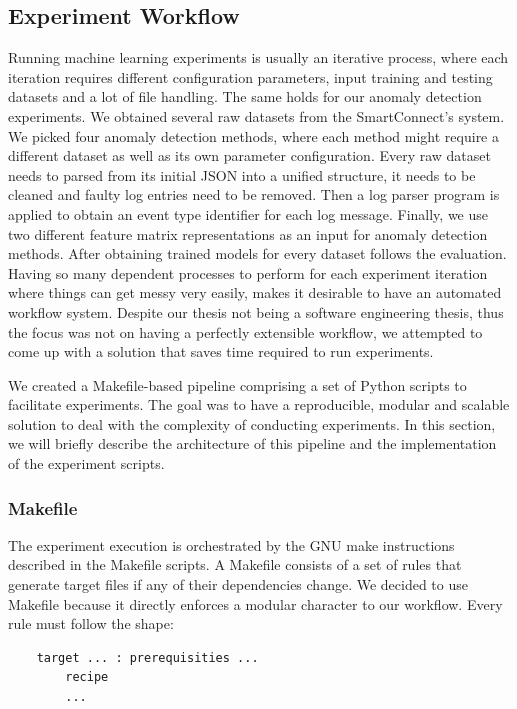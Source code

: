 \subsection{Experiment Workflow}
Running machine learning experiments is usually an iterative process, where each iteration requires different configuration parameters, input training and testing datasets and a lot of file handling. The same holds for our anomaly detection experiments. We obtained several raw datasets from the SmartConnect's system. We picked four anomaly detection methods, where each method might require a different dataset as well as its own parameter configuration. Every raw dataset needs to parsed from its initial JSON into a unified structure, it needs to be cleaned and faulty log entries need to be removed. Then a log parser program is applied to obtain an event type identifier for each log message. Finally, we use two different feature matrix representations as an input for anomaly detection methods. After obtaining trained models for every dataset follows the evaluation. Having so many dependent processes to perform for each experiment iteration where things can get messy very easily, makes it desirable to have an automated workflow system. Despite our thesis not being a software engineering thesis, thus the focus was not on having a perfectly extensible workflow, we attempted to come up with a solution that saves time required to run experiments.

We created a Makefile-based pipeline comprising a set of Python scripts to facilitate experiments. The goal was to have a reproducible, modular and scalable solution to deal with the complexity of conducting experiments. In this section, we will briefly describe the architecture of this pipeline and the implementation of the experiment scripts.
 
 \subsubsection*{Makefile}
The experiment execution is orchestrated by the GNU make instructions described in the Makefile scripts. A Makefile consists of a set of rules that generate target files if any of their dependencies change. We decided to use Makefile because it directly enforces a modular character to our workflow. Every rule must follow the shape:

\begin{verbatim}
    target ... : prerequisities ... 
        recipe
        ...
\end{verbatim}


